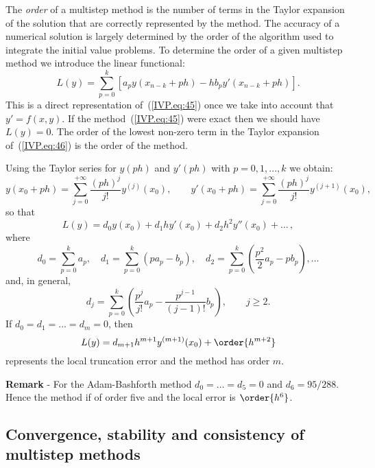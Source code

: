 The \textit{order} of a multistep method is the number of terms in the
Taylor expansion of the solution that are correctly represented by the
method.  The accuracy of a numerical solution is largely determined by
the order of the algorithm used to integrate the initial value
problems.  To determine the order of a given multistep method we
introduce the linear functional:
%
\begin{equation}
  L(y) = \sum_{p=0}^k [a_p y(x_{n-k}+ p h) - h b_p y'(x_{n-k}+p h)].
  \label{IVP.eq:46}
\end{equation}
%
This is a direct representation of~(\ref{IVP.eq:45}) once we take into
account that $y'=f(x,y)$.  If the method~(\ref{IVP.eq:45}) were exact
then we should have $L(y)=0$.  The order of the lowest non-zero term
in the Taylor expansion of~(\ref{IVP.eq:46}) is the order of the
method.

\noindent
Using the Taylor series for $y(p h)$ and $y'(p h)$ with $p=0,1,...,k$
we obtain:
%
\begin{equation}
  y(x_0+p h) = \sum_{j=0}^{+\infty} \frac{(p h)^j}{j!} y^{(j)} (x_0),
  \qquad
  y'(x_0+p h) = \sum_{j=0}^{+\infty} \frac{(p h)^j}{j!} y^{(j+1)}(x_0),
\end{equation}
%
so that
%
\begin{equation}
  L(y) = d_0 y(x_0) + d_1 h y'(x_0) + d_2 h^2 y''(x_0) + \ldots \, ,
\end{equation}
%
where
%
\begin{equation}
  d_0 = \sum_{p=0}^k a_p, \quad
  d_1 = \sum_{p=0}^k (p a_p-b_p), \quad
  d_2 = \sum_{p=0}^k \left ( \frac{p^2}{2} a_p - p b_p \right ), \ldots
\end{equation}
%
and, in general,
%
\begin{equation}
  d_j = \sum_{p=0}^k \left( \frac{p^j}{j!} a_p -
    \frac{p^{j-1}}{(j-1)!} b_p \right) ,
  \qquad j \ge 2 .
\end{equation}
%
If $d_0=d_1=...=d_m=0$, then
%
\begin{equation}
  L(y) = d_{m+1} h^{m+1} y^{(m+1)}(x_0) + \order{h^{m+2}}
\end{equation}
%
represents the local truncation error and the method has order $m$.

\smallskip

\noindent \textbf{Remark} - For the Adam-Bashforth method
$d_0=\ldots=d_5 = 0$ and $d_6=95/288$.  Hence the method if of order
five and the local error is $\order{h^6}$.

\subsection[Convergence, stability and consistency]{Convergence, stability and consistency of multistep methods}

